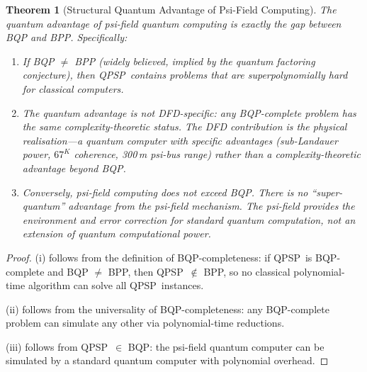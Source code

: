 \documentclass[11pt]{article}
\newtheorem{theorem}{Theorem}[section]
\theoremstyle{definition}
\theoremstyle{remark}
\newcommand{\QPSP}{\textsc{QPSP}}
\begin{document}
\begin{theorem}[Structural Quantum Advantage of Psi-Field Computing]
\label{thm:structural-advantage}
The quantum advantage of psi-field quantum computing is \emph{exactly}
the gap between BQP and BPP. Specifically:
\begin{enumerate}[label=(\roman*)]
  \item If BQP $\neq$ BPP (widely believed, implied by the quantum
    factoring conjecture), then \QPSP\ contains problems that are
    superpolynomially hard for classical computers.

  \item The quantum advantage is not DFD-specific: any BQP-complete
    problem has the same complexity-theoretic status. The DFD contribution
    is the \emph{physical realisation}---a quantum computer with specific
    advantages (sub-Landauer power, $67^K$ coherence, 300\,m psi-bus range)
    rather than a complexity-theoretic advantage beyond BQP.

  \item Conversely, psi-field computing does not exceed BQP. There is no
    ``super-quantum'' advantage from the psi-field mechanism. The psi-field
    provides the \emph{environment and error correction} for standard
    quantum computation, not an extension of quantum computational power.
\end{enumerate}
\end{theorem}

\begin{proof}
(i) follows from the definition of BQP-completeness: if \QPSP\ is
BQP-complete and BQP $\neq$ BPP, then \QPSP\ $\not\in$ BPP, so no
classical polynomial-time algorithm can solve all \QPSP\ instances.

(ii) follows from the universality of BQP-completeness: any BQP-complete
problem can simulate any other via polynomial-time reductions.

(iii) follows from \QPSP\ $\in$ BQP: the psi-field quantum computer
can be simulated by a standard quantum computer with polynomial overhead.
\end{proof}
\end{document}

